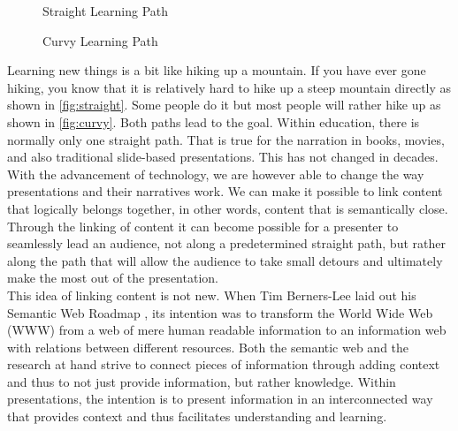 \documentclass[twoside, 12pt]{article}
\begin{document}
\begin{figure}
\vspace{-28pt}
  \begin{center}
\vspace{-20pt}
  \caption{Straight Learning Path}
  \label{fig:straight}
\vspace{5pt}  

  \end{center}
\vspace{-20pt}
  \caption{Curvy Learning Path}
  \label{fig:curvy}
\vspace{-10pt}
\end{figure}

Learning new things is a bit like hiking up a mountain. If you have ever gone hiking, you know that it is relatively hard to hike up a steep mountain directly as shown in \autoref{fig:straight}. Some people do it but most people will rather hike up as shown in \autoref{fig:curvy}. Both paths lead to the goal. Within education, there is normally only one straight path. That is true for the narration in books, movies, and also traditional slide-based presentations. This has not changed in decades. With the advancement of technology, we are however able to change the way presentations and their narratives work. We can make it possible to link content that logically belongs together, in other words, content that is semantically close. Through the linking of content it can become possible for a presenter to seamlessly lead an audience, not along a predetermined straight path, but rather along the path that will allow the audience to take small detours and ultimately make the most out of the presentation.\\

This idea of linking content is not new. When Tim Berners-Lee laid out his Semantic Web Roadmap \cite{BernersLee:tsw98}, its intention was to transform the World Wide Web (WWW) from a web of mere human readable information to an information web with relations between different resources. Both the semantic web and the research at hand strive to connect pieces of information through adding context and thus to not just provide information, but rather knowledge. Within presentations, the intention is to present information in an interconnected way that provides context and thus facilitates understanding and learning.\\
\end{document}
